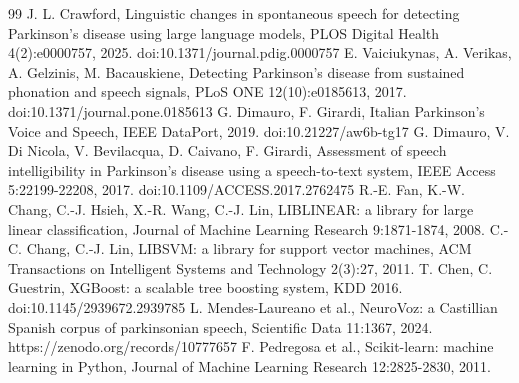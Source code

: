 \documentclass[11pt,a4paper]{article}
\begin{document}
\begin{thebibliography}{99}
 J. L. Crawford, Linguistic changes in spontaneous speech for detecting Parkinson's disease using large language models, PLOS Digital Health 4(2):e0000757, 2025. doi:10.1371/journal.pdig.0000757
 E. Vaiciukynas, A. Verikas, A. Gelzinis, M. Bacauskiene, Detecting Parkinson's disease from sustained phonation and speech signals, PLoS ONE 12(10):e0185613, 2017. doi:10.1371/journal.pone.0185613
 G. Dimauro, F. Girardi, Italian Parkinson's Voice and Speech, IEEE DataPort, 2019. doi:10.21227/aw6b-tg17
 G. Dimauro, V. Di Nicola, V. Bevilacqua, D. Caivano, F. Girardi, Assessment of speech intelligibility in Parkinson's disease using a speech-to-text system, IEEE Access 5:22199-22208, 2017. doi:10.1109/ACCESS.2017.2762475
 R.-E. Fan, K.-W. Chang, C.-J. Hsieh, X.-R. Wang, C.-J. Lin, LIBLINEAR: a library for large linear classification, Journal of Machine Learning Research 9:1871-1874, 2008.
 C.-C. Chang, C.-J. Lin, LIBSVM: a library for support vector machines, ACM Transactions on Intelligent Systems and Technology 2(3):27, 2011.
 T. Chen, C. Guestrin, XGBoost: a scalable tree boosting system, KDD 2016. doi:10.1145/2939672.2939785
 L. Mendes-Laureano et al., NeuroVoz: a Castillian Spanish corpus of parkinsonian speech, Scientific Data 11:1367, 2024. https://zenodo.org/records/10777657
 F. Pedregosa et al., Scikit-learn: machine learning in Python, Journal of Machine Learning Research 12:2825-2830, 2011.
\end{thebibliography}
\end{document}
